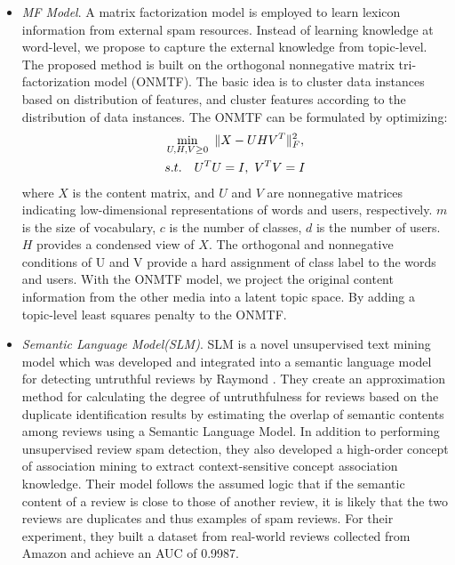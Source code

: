 \documentclass[lettersize,journal]{IEEEtran}
\begin{document}
\begin{itemize}
  \item \emph{MF Model}.
A matrix factorization model is employed to learn lexicon information from external spam resources. Instead of learning knowledge at word-level, we propose to capture the external knowledge from topic-level.  The proposed method is built on the orthogonal nonnegative matrix tri-factorization model (ONMTF). The basic idea is to cluster data instances based on distribution of features, and cluster features according to the distribution of data instances. The ONMTF can be formulated by optimizing:
      \begin{equation}\label{ONMTF}
        \begin{split}
        &\min \limits_{U,H,V\geq0} \,\, \Arrowvert X-UHV^T \Arrowvert _F^2,\\
        &s.t. \quad U^TU=I,\ V^TV=I
        \end{split}
      \end{equation} where $X$ is the content matrix, and $U$ and $V$ are nonnegative matrices indicating low-dimensional representations of words and users, respectively. $m$ is the size of vocabulary, $c$ is the number of classes, $d$ is the number of users. $H$ provides a condensed view of $X$. The orthogonal and nonnegative conditions of U and V provide a hard assignment of class label to the words and users. With the ONMTF model, we project the original content information from the other media into a latent topic space. By adding a topic-level least squares penalty to the ONMTF.

  \item \emph{Semantic Language Model(SLM)}.
SLM is a novel unsupervised text mining model which was developed and integrated into a semantic language model for detecting untruthful reviews by Raymond \cite{Lau2011Text}. They create an approximation method for calculating the degree of untruthfulness for reviews based on the duplicate identification results by estimating the overlap of semantic contents among reviews using a Semantic Language Model. In addition to performing unsupervised review spam detection, they also developed a high-order concept of association mining to extract context-sensitive concept association knowledge. Their model follows the assumed logic that if the semantic content of a review is close to those of another review, it is likely that the two reviews are duplicates and thus examples of spam reviews. For their experiment, they built a dataset from real-world reviews collected from Amazon and achieve an AUC of 0.9987.

\end{itemize}
\end{document}
